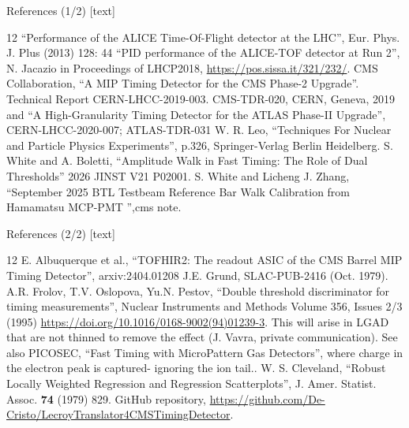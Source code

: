 \begin{frame}{References (1/2)}
\fontsize{9}{10.5}\selectfont
{}[text]
\begin{thebibliography}{12}
``Performance of the ALICE Time-Of-Flight detector at the LHC'',
Eur. Phys. J. Plus (2013) 128: 44
``PID performance of the ALICE-TOF detector at Run 2'', N. Jacazio in
Proceedings of LHCP2018, \url{https://pos.sissa.it/321/232/}.
CMS Collaboration, ``A MIP Timing Detector for the CMS Phase-2 Upgrade''.
Technical Report CERN-LHCC-2019-003. CMS-TDR-020, CERN, Geneva, 2019 and
``A High-Granularity Timing Detector for the ATLAS Phase-II Upgrade'',
CERN-LHCC-2020-007; ATLAS-TDR-031
W. R. Leo, ``Techniques For Nuclear and Particle Physics Experiments'',
p.326, Springer-Verlag Berlin Heidelberg.
S. White and A. Boletti, ``Amplitude Walk in Fast Timing: The Role of Dual Thresholds''
2026 JINST V21 P02001.
S. White and Licheng J. Zhang, ``September 2025 BTL Testbeam Reference Bar Walk
Calibration from Hamamatsu MCP-PMT '',cms note.
\end{thebibliography}
\end{frame}

\begin{frame}{References (2/2)}
\fontsize{9}{10.5}\selectfont
{}[text]
\begin{thebibliography}{12}
E. Albuquerque et al., ``TOFHIR2: The readout ASIC of the CMS Barrel MIP Timing
Detector'', arxiv:2404.01208
J.E. Grund, SLAC-PUB-2416 (Oct. 1979).
A.R. Frolov, T.V. Oslopova, Yu.N. Pestov, ``Double threshold discriminator for
timing measurements'', Nuclear Instruments and Methods Volume 356, Issues 2/3
(1995) \url{https://doi.org/10.1016/0168-9002(94)01239-3}.
This will arise in LGAD that are not thinned to remove the effect (J. Vavra,
private communication). See also PICOSEC, ``Fast Timing with MicroPattern Gas
Detectors'', where charge in the electron peak is captured- ignoring the ion tail..
W. S. Cleveland, ``Robust Locally Weighted Regression and Regression Scatterplots'',
J. Amer. Statist. Assoc. \textbf{74} (1979) 829.
GitHub repository,
\url{https://github.com/De-Cristo/LecroyTranslator4CMSTimingDetector}.
\end{thebibliography}
\end{frame}
